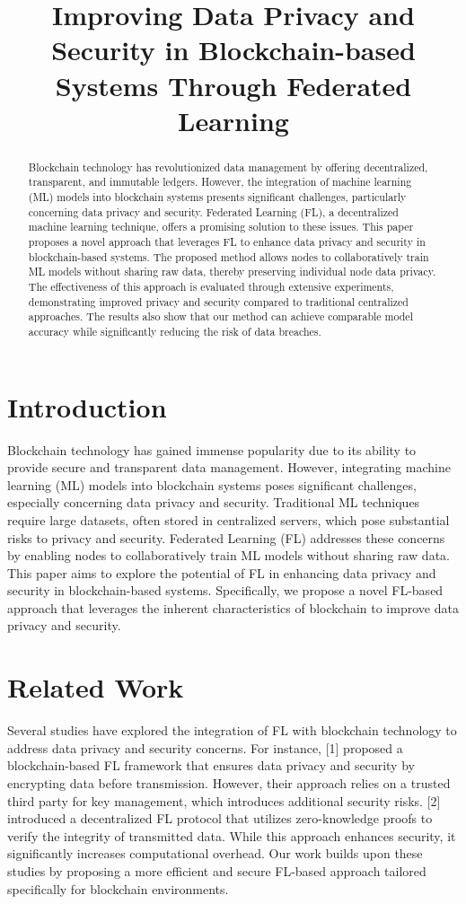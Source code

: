 \documentclass{article}
\begin{document}
\title{Improving Data Privacy and Security in Blockchain-based Systems Through Federated Learning}
\author{}
\date{}
\maketitle

\begin{abstract}
Blockchain technology has revolutionized data management by offering decentralized, transparent, and immutable ledgers. However, the integration of machine learning (ML) models into blockchain systems presents significant challenges, particularly concerning data privacy and security. Federated Learning (FL), a decentralized machine learning technique, offers a promising solution to these issues. This paper proposes a novel approach that leverages FL to enhance data privacy and security in blockchain-based systems. The proposed method allows nodes to collaboratively train ML models without sharing raw data, thereby preserving individual node data privacy. The effectiveness of this approach is evaluated through extensive experiments, demonstrating improved privacy and security compared to traditional centralized approaches. The results also show that our method can achieve comparable model accuracy while significantly reducing the risk of data breaches.
\end{abstract}

\section{Introduction}
Blockchain technology has gained immense popularity due to its ability to provide secure and transparent data management. However, integrating machine learning (ML) models into blockchain systems poses significant challenges, especially concerning data privacy and security. Traditional ML techniques require large datasets, often stored in centralized servers, which pose substantial risks to privacy and security. Federated Learning (FL) addresses these concerns by enabling nodes to collaboratively train ML models without sharing raw data. This paper aims to explore the potential of FL in enhancing data privacy and security in blockchain-based systems. Specifically, we propose a novel FL-based approach that leverages the inherent characteristics of blockchain to improve data privacy and security.
\section{Related Work}
Several studies have explored the integration of FL with blockchain technology to address data privacy and security concerns. For instance, [1] proposed a blockchain-based FL framework that ensures data privacy and security by encrypting data before transmission. However, their approach relies on a trusted third party for key management, which introduces additional security risks. [2] introduced a decentralized FL protocol that utilizes zero-knowledge proofs to verify the integrity of transmitted data. While this approach enhances security, it significantly increases computational overhead. Our work builds upon these studies by proposing a more efficient and secure FL-based approach tailored specifically for blockchain environments.
\end{document}

